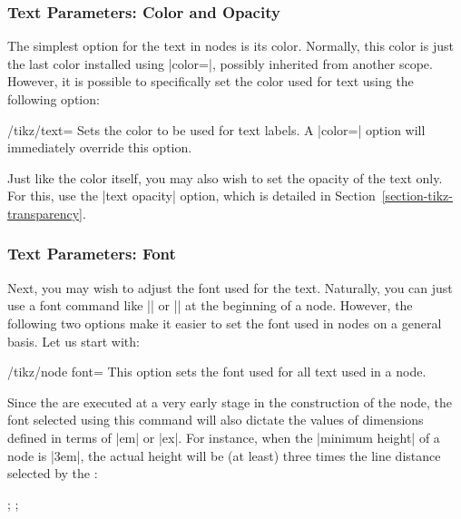 \subsubsection{Text Parameters: Color and Opacity}

The simplest option for the text in nodes is its color. Normally, this color is
just the last color installed using |color=|, possibly inherited from another
scope. However, it is possible to specifically set the color used for text
using the following option:

\begin{key}{/tikz/text=}
    Sets the color to be used for text labels. A |color=| option will
    immediately override this option.
\begin{codeexample}[]
\end{codeexample}
\end{key}

Just like the color itself, you may also wish to set the opacity of the text
only. For this, use the |text opacity| option, which is detailed in
Section~\ref{section-tikz-transparency}.


\subsubsection{Text Parameters: Font}

Next, you may wish to adjust the font used for the text. Naturally, you can
just use a font command like |\small| or |\rm| at the beginning of a node.
However, the following two options make it easier to set the font used in nodes
on a general basis. Let us start with:

\begin{key}{/tikz/node font=}
    This option sets the font used for all text used in a node.
\begin{codeexample}[]
\end{codeexample}
    Since the  are executed at a very early stage in the
    construction of the node, the font selected using this command will also
    dictate the values of dimensions defined in terms of |em| or |ex|. For
    instance, when the |minimum height| of a node is |3em|, the actual height
    will be (at least) three times the line distance selected by the :
\begin{codeexample}[]
\tikz {};
\tikz {};
\end{codeexample}
\end{key}

